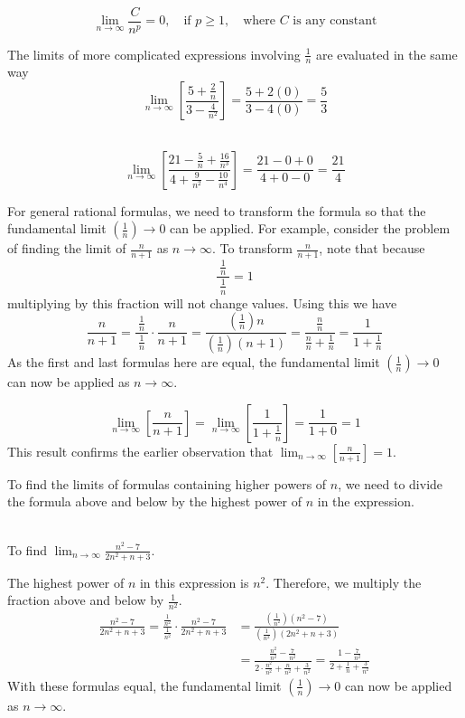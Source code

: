 \\
\[
\lim_{n \to \infty } \frac{C}{n^p} = 0, \quad \text{if } p \ge 1, \quad \text{where $C$ is any constant}
\]

The limits of more complicated expressions involving $\frac{1}{n}$ are evaluated in the same way
\\
\[
\lim_{n \to \infty } \left[ \frac{5+\frac{2}{n}}{3-\frac{4}{n^2}} \right]= \frac{5+2(0)}{3-4(0)}=\frac{5}{3}
\]

\\
\[
\lim_{n \to \infty } \left[ \frac{21 -\frac{5}{n}+\frac{16}{n^3}}{4+\frac{9}{n^2}-\frac{10}{n^4}} \right]=\frac{21-0+0}{4+0-0}=\frac{21}{4}
\]

For general rational formulas, we need to transform the formula so that the fundamental limit $\left( \frac{1}{n} \right) \to 0$ can be applied. For example, consider the problem of finding the limit of $\frac{n}{n+1}$ as $n \to \infty $. To transform $\frac{n}{n+1}$, note that because
\[
\frac{\ \frac{1}{n}\ }{\ \frac{1}{n}\ }=1
\]
multiplying by this fraction will not change values. Using this we have
\[ \frac{n}{n+1} =   \frac{\ \frac{1}{n}\ }{\ \frac{1}{n}\ }\cdot \frac{n}{n+1} = \frac{\left( \frac{1}{n} \right) n}{\left( \frac{1}{n} \right)(n+1)} = \frac{\frac{n}{n}}{\frac{n}{n}+\frac{1}{n}}= \frac{1}{1+\frac{1}{n}}
\]
As the first and last formulas here are equal, the fundamental limit $\left( \frac{1}{n} \right) \to 0$ can now be applied as $n \to \infty $.

\[
\lim_{n \to \infty } \left[ \frac{n}{n+1} \right]= \lim_{n \to \infty } \left[ \frac{1}{1+\frac{1}{n}} \right]= \frac{1}{1+0}=1
\]
This result confirms the earlier observation that $\lim_{n \to \infty } \left[ \frac{n}{n+1} \right]=1$.

To find the limits of formulas containing higher powers of $n$, we need to divide the formula above and below by the highest power of $n$ in the expression.

\\
\noindent To find $\lim_{n \to \infty } \frac{n^2-7}{2n^2+n+3}$.

The highest power of $n$ in this expression is $n^2$. Therefore, we multiply the fraction above and below by $\frac{1}{n^2}$.
\begin{align*}
\frac{n^2-7}{2n^2+n+3}=\frac{\frac{1}{n^2}}{\frac{1}{n^2}}\cdot \frac{n^2-7}{2n^2+n+3} & = \frac{\left( \frac{1}{n^2} \right) \left( n^2-7 \right)}{ \left( \frac{1}{n^2} \right) \left( 2n^2+n+3 \right)}\\ & = \frac{\frac{n^2}{n^2}-\frac{7}{n^2}}{2 \cdot \frac{n^2}{n^2}+\frac{n}{n^2}+\frac{3}{n^2}} = \frac{1-\frac{7}{n^2}}{2+\frac{1}{n}+\frac{3}{n^2}}
\end{align*}
With these formulas equal, the fundamental limit $\left( \frac{1}{n} \right) \to 0$ can now be applied as $n \to \infty $.


